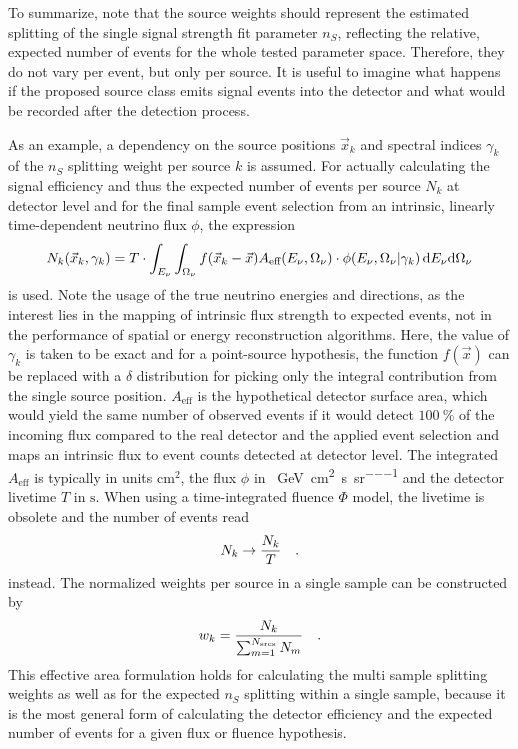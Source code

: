 To summarize, note that the source weights should represent the estimated splitting of the single signal strength fit parameter $n_S$, reflecting the relative, expected number of events for the whole tested parameter space.
Therefore, they do not vary per event, but only per source.
It is useful to imagine what happens if the proposed source class emits signal events into the detector and what would be recorded after the detection process.

As an example, a dependency on the source positions $\vec{x}_k$ and spectral indices $\gamma_k$ of the $n_S$ splitting weight per source $k$ is assumed.
For actually calculating the signal efficiency and thus the expected number of events per source $N_k$ at detector level and for the final sample event selection from an intrinsic, linearly time-dependent neutrino flux $\phi$, the expression
\begin{equation}
  \label{equ:eff_area_analytic}
  N_k(\vec{x}_k, \gamma_k)
  = T \cdot \int_{E_\nu} \int_{\Omega_\nu} f(\vec{x}_k - \vec{x})
      A_\text{eff}(E_\nu,\Omega_\nu) \cdot
      \phi(E_\nu,\Omega_\nu | \gamma_k) \,\mathrm{d}E_\nu\mathrm{d}\Omega_\nu
\end{equation}
is used.
Note the usage of the true neutrino energies and directions, as the interest lies in the mapping of intrinsic flux strength to expected events, not in the performance of spatial or energy reconstruction algorithms.
Here, the value of $\gamma_k$ is taken to be exact and for a point-source hypothesis, the function $f(\vec{x})$ can be replaced with a $\delta$ distribution for picking only the integral contribution from the single source position.
$A_\text{eff}$ is the hypothetical detector surface area, which would yield the same number of observed events if it would detect $\SI{100}{\percent}$ of the incoming flux compared to the real detector and the applied event selection and maps an intrinsic flux to event counts detected at detector level.
The integrated $A_\text{eff}$ is typically in units $\si{\cm\squared}$, the flux $\phi$ in \si{\per\GeV\per\cm\squared\per\second\per\steradian} and the detector livetime $T$ in $\si{\second}$.
When using a time-integrated fluence $\Phi$ model, the livetime is obsolete and the number of events read
\begin{equation}
  N_k \rightarrow \frac{N_k}{T}
  \quad\text{.}
\end{equation}
instead.
The normalized weights per source in a single sample can be constructed by
\begin{equation}
  \label{equ:general_satcking_weights}
  w_k = \frac{N_k}{\sum_{m=1}^{N_\text{srcs}} N_m}
  \quad\text{.}
\end{equation}
This effective area formulation holds for calculating the multi sample splitting weights as well as for the expected $n_S$ splitting within a single sample, because it is the most general form of calculating the detector efficiency and the expected number of events for a given flux or fluence hypothesis.

